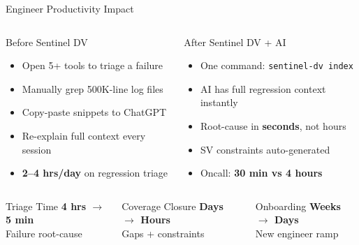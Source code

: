 \documentclass[aspectratio=169,t]{beamer}
\begin{document}
\begin{frame}{Engineer Productivity Impact}
  \begin{columns}[T]
      \begin{block}{Before Sentinel DV}
        \small
        \begin{itemize}
          \item Open 5+ tools to triage a failure
          \item Manually grep 500K-line log files
          \item Copy-paste snippets to ChatGPT
          \item Re-explain full context every session
          \item \textbf{2--4 hrs/day} on regression triage
        \end{itemize}
      \end{block}

      \begin{block}{After Sentinel DV + AI}
        \small
        \begin{itemize}
          \item One command: \texttt{sentinel-dv index}
          \item AI has full regression context instantly
          \item Root-cause in \textbf{seconds}, not hours
          \item SV constraints auto-generated
          \item Oncall: \textbf{30 min vs 4 hours}
        \end{itemize}
      \end{block}
  \end{columns}
  \vspace{0.3em}
  \begin{columns}[T]
      \begin{exampleblock}{Triage Time}
        \centering
        \large \textbf{4 hrs $\rightarrow$ 5 min}\\
        \small Failure root-cause
      \end{exampleblock}
      \begin{exampleblock}{Coverage Closure}
        \centering
        \large \textbf{Days $\rightarrow$ Hours}\\
        \small Gaps + constraints
      \end{exampleblock}
      \begin{exampleblock}{Onboarding}
        \centering
        \large \textbf{Weeks $\rightarrow$ Days}\\
        \small New engineer ramp
      \end{exampleblock}
  \end{columns}
\end{frame}
\end{document}
